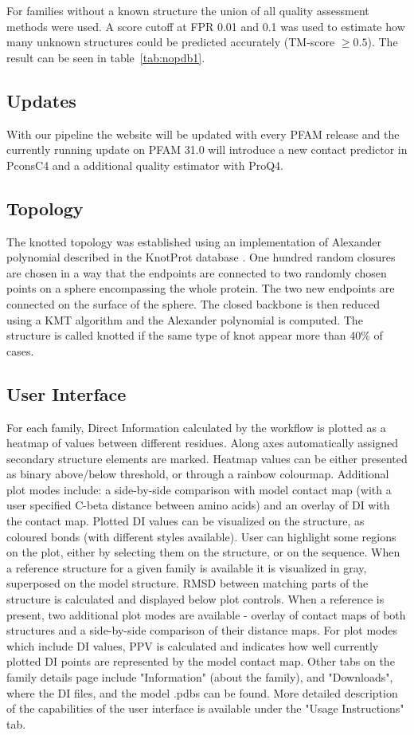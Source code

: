 \documentclass[a4,center,fleqn]{NAR}
\begin{document}
For families without a known structure the union of all quality assessment methods were used.
A score cutoff at FPR 0.01 and 0.1 was used to estimate how many unknown structures
could be predicted accurately (TM-score $\ge 0.5$). The result can be seen in table~\ref{tab:nopdb1}.
\subsection{Updates}

With our pipeline the website will be updated with every PFAM release
and the currently running update on PFAM 31.0 will introduce a new
contact predictor in PconsC4 and a additional quality estimator with ProQ4. 

\subsection{Topology}
The knotted topology was established using an implementation of Alexander polynomial described in the KnotProt database \cite{jamroz2014knotprot}. One hundred random closures are chosen in a way that the endpoints are connected to two randomly 
chosen points on a sphere encompassing the whole protein. The two new endpoints are 
connected on the surface of the sphere. The closed backbone is then reduced using a
KMT algorithm and the Alexander polynomial is computed. The structure is called knotted if the same type of knot
appear more than 40\% of cases. 

\subsection{User Interface}
For each family, Direct Information calculated by the workflow is plotted as a heatmap of values between
different residues. Along axes automatically assigned secondary structure elements are marked. Heatmap values can be either presented as binary above/below threshold, or through a rainbow colourmap. Additional plot modes include: a side-by-side comparison with model contact map (with a user specified C-beta distance between amino acids) and an overlay of DI with the contact map. 
Plotted DI values can be visualized on the structure, as coloured bonds (with different styles available). User can highlight some regions on the plot, either by selecting them on the structure, or on the sequence.
When a reference structure for a given family is available it is visualized in gray, superposed on the model structure. RMSD between matching parts of the structure is calculated and displayed below plot controls. When a reference is present, two additional plot modes are available - overlay of contact maps of both structures and a side-by-side comparison of their distance maps. 
For plot modes which include DI values, PPV is calculated and indicates how well currently plotted DI points are represented by the model contact map.
Other tabs on the family details page include "Information" (about the family), and "Downloads", where the DI files, and the model .pdbs can be found.
More detailed description of the capabilities of the user interface is available under the "Usage Instructions" tab.
\end{document}
